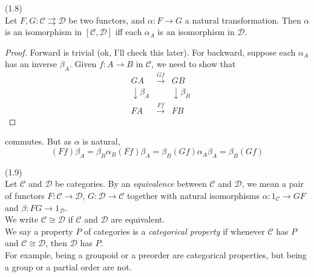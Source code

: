 \documentclass[a4paper]{article}
\begin{document}
\begin{lemma} (1.8)\\
    Let $F,G: \mathcal{C} \rightrightarrows \mathcal{D}$ be two functors, and $\alpha: F \to G$ a natural transformation. Then $\alpha$ is an isomorphism in $[\mathcal{C},\mathcal{D}]$ iff each $\alpha_A$ is an isomorphism in $\mathcal{D}$.
    \begin{proof}
        Forward is trivial (ok, I'll check this later). For backward, suppose each $\alpha_A$ has an inverse $\beta_A$. Given $f:A \to B$ in $\mathcal{C}$, we need to show that 
        \begin{equation*}
            \begin{aligned}
                &GA &\xrightarrow{Gf} &GB\\
                &\downarrow \beta_A & &\downarrow \beta_B\\
                &FA &\xrightarrow{Ff} & FB
            \end{aligned}
        \end{equation*}
    \end{proof}
    commutes. But as $\alpha$ is natural, 
    $$(Ff)\beta_A = \beta_B \alpha_B (Ff)\beta_A = \beta_B (Gf) \alpha_A \beta_A = \beta_B (Gf)$$
\end{lemma}

\begin{defi} (1.9)\\
    Let $\mathcal{C}$ and $\mathcal{D}$ be categories. By an \emph{equivalence} between $\mathcal{C}$ and $\mathcal{D}$, we mean a pair of functors $F:\mathcal{C} \to \mathcal{D}$, $G:\mathcal{D} \to \mathcal{C}$ together with natural isomorphisms $\alpha: 1_\mathcal{C} \to GF$ and $\beta: FG \to 1_\mathcal{D}$.\\
    We write $\mathcal{C} \cong \mathcal{D}$ if $\mathcal{C}$ and $\mathcal{D}$ are equivalent.\\
    We say a property $P$ of categories is a \emph{categorical property} if whenever $\mathcal{C}$ has $P$ and $\mathcal{C} \cong \mathcal{D}$, then $\mathcal{D}$ has $P$.\\
    For example, being a groupoid or a preorder are categorical properties, but being a group or a partial order are not.
\end{defi}
\end{document}
